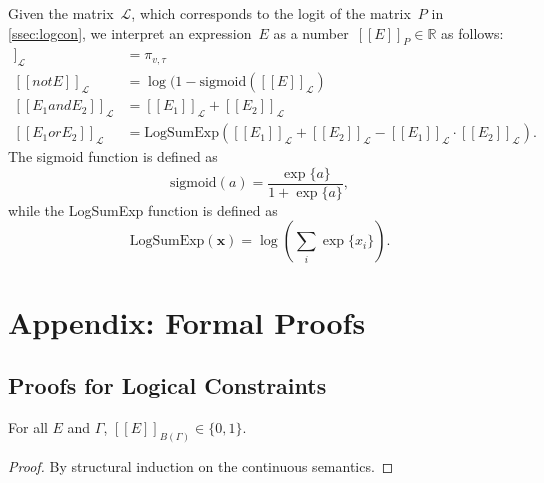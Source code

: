 \documentclass[acmsmall, review, anonymous]{acmart}\settopmatter{printfolios=true,printccs=false,printacmref=false}
\newcommand{\qqpi}[2]{[\![#2]\!]_{#1}}
\newcommand{\margincomment}[2]{\marginpar{\scriptsize\color{Maroon}#1 says: #2}}
\newcommand{\ivp}[1]{\margincomment{IVP}{#1}}
\begin{document}
Given the matrix~$\mathcal{L}$, which corresponds to the logit of the matrix~$P$ in \cref{ssec:logcon}, we interpret an expression~$E$ as a number~$\qqpi{P}{E} \in \mathbb{R}$ as  follows:
\begin{align*}
	\qqpi{\mathcal{L}}{x_v \mathrel{is} l_\tau} & = \pi_{v,\tau}                                                \\ \label{eq:logits}
	\qqpi{\mathcal{L}}{\mathrel{not} E}         & = \log(1-\text{sigmoid}(\qqpi{\mathcal{L}}{E})                \\
	\qqpi{\mathcal{L}}{E_1 \mathrel{and} E_2}   & = \qqpi{\mathcal{L}}{E_1} \mathrel{+} \qqpi{\mathcal{L}}{E_2} \\
	\qqpi{\mathcal{L}}{E_1 \mathrel{or} E_2}    & = \text{LogSumExp}(
	\qqpi{\mathcal{L}}{E_1} + \qqpi{\mathcal{L}}{E_2} - \qqpi{\mathcal{L}}{E_1} \cdot \qqpi{\mathcal{L}}{E_2}).
\end{align*}
The sigmoid function is defined as
\begin{equation*}
	\text{sigmoid}(a) = \frac{\exp\{a\}}{1 + \exp\{a\}},
\end{equation*}
while the LogSumExp function is defined as
\begin{equation*}
	\text{LogSumExp}(\bm{x}) = \log\left( \sum_i \exp\{x_i\} \right).
\end{equation*}

\section{Appendix: Formal Proofs}\label{app:proofs}
\subsection{Proofs for Logical Constraints}


\begin{lemma} \label{lem:binary}
    For all $E$ and $\Gamma$, $\qqpi{B(\Gamma)}{E} \in \{0,1\}$.
\end{lemma}

\begin{proof} %
    By structural induction on the continuous semantics.
\end{proof}
\end{document}
